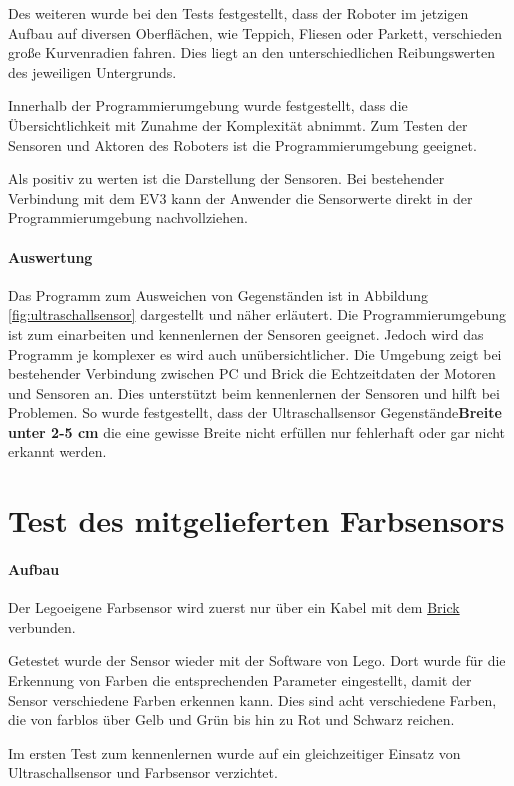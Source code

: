 Des weiteren wurde bei den Tests festgestellt, dass der Roboter im jetzigen Aufbau auf diversen Oberflächen, wie Teppich, Fliesen oder Parkett, verschieden große Kurvenradien fahren. Dies liegt an den unterschiedlichen Reibungswerten des jeweiligen Untergrunds.

Innerhalb der Programmierumgebung wurde festgestellt, dass die Übersichtlichkeit mit Zunahme der Komplexität abnimmt. Zum Testen der Sensoren und Aktoren des Roboters ist die Programmierumgebung geeignet.

Als positiv zu werten ist die Darstellung der Sensoren. Bei bestehender Verbindung mit dem EV3 kann der Anwender die Sensorwerte direkt in der Programmierumgebung nachvollziehen.

\paragraph{Auswertung}
Das Programm zum Ausweichen von Gegenständen ist in Abbildung \vref{fig:ultraschallsensor} dargestellt und näher erläutert. Die Programmierumgebung ist zum einarbeiten und kennenlernen der Sensoren geeignet. Jedoch wird das Programm je komplexer es wird auch unübersichtlicher. Die Umgebung zeigt bei bestehender Verbindung zwischen PC und Brick die Echtzeitdaten der Motoren und Sensoren an. Dies unterstützt beim kennenlernen der Sensoren und hilft bei Problemen. So wurde festgestellt, dass der Ultraschallsensor Gegenstände\textbf{Breite unter 2-5 cm} die eine gewisse Breite nicht erfüllen nur fehlerhaft oder gar nicht erkannt werden.  

\section{Test des mitgelieferten Farbsensors}
\paragraph{Aufbau}
Der Legoeigene Farbsensor wird zuerst nur über ein Kabel mit dem \underline{Brick} verbunden. 

Getestet wurde der Sensor wieder mit der Software von Lego. Dort wurde für die Erkennung von Farben die entsprechenden Parameter eingestellt, damit der Sensor verschiedene Farben erkennen kann. Dies sind acht verschiedene Farben, die von farblos über Gelb und Grün bis hin zu Rot und Schwarz reichen.

Im ersten Test zum kennenlernen wurde auf ein gleichzeitiger Einsatz von Ultraschallsensor und Farbsensor verzichtet.

